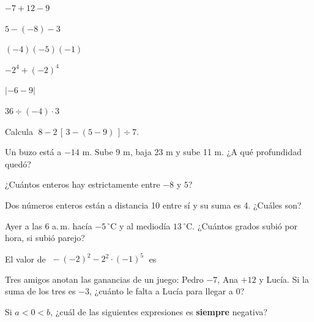 \taller
{}
\begin{ejercicios}[2]
\item $-7 + 12 - 9$ 
\item $5 - (-8) - 3$ 
\item $(-4)(-5)(-1)$ 
\item $-2^4 + (-2)^4$ 
\item $|{-6} - 9|$ 
\item $36 \div (-4) \cdot 3$ 
\end{ejercicios}
\begin{ejercicios}
\item Calcula $\;8 - 2\,[\,3 - (5 - 9)\,] \div 7$. 
\item Un buzo está a $-14$ m. Sube 9 m, baja 23 m y sube 11 m. ¿A qué profundidad quedó? 
\item ¿Cuántos enteros hay estrictamente entre $-8$ y $5$? 
\item Dos números enteros están a distancia 10 entre sí y su suma es 4. ¿Cuáles son? 
\item Ayer a las 6 a.\,m. hacía $-5\,^{\circ}\mathrm{C}$ y al mediodía $13\,^{\circ}\mathrm{C}$. ¿Cuántos grados subió por hora, si subió parejo? 
\end{ejercicios}
\begin{ejercicios}
\item El valor de $\;-(-2)^2 - 2^2 \cdot (-1)^{5}\;$ es
\item Tres amigos anotan las ganancias de un juego: Pedro $-7$, Ana $+12$ y Lucía. Si la suma de los tres es $-3$,
¿cuánto le falta a Lucía para llegar a 0?
\item Si $a < 0 < b$, ¿cuál de las siguientes expresiones es \textbf{siempre} negativa?
\end{ejercicios}

